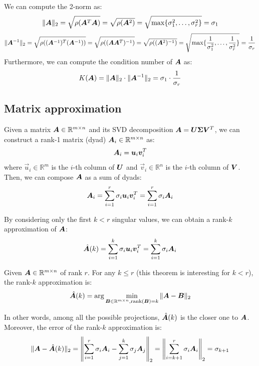 We can compute the 2-norm as:
\[ \Vert {\bm{A}} \Vert_2 = \sqrt{\rho({\bm{A}}^T{\bm{A}})} = \sqrt{\rho({\bm{A}}^2)} = \sqrt{\max\{\sigma_1^2, \dots, \sigma_r^2\}} = \sigma_1 \]
\[ 
    \Vert {\bm{A}}^{-1} \Vert_2 = \sqrt{\rho(({\bm{A}}^{-1})^T({\bm{A}}^{-1}))} = 
    \sqrt{\rho(({\bm{A}}{\bm{A}}^T)^{-1})} = \sqrt{\rho(({\bm{A}}^2)^{-1})} = \sqrt{\max\{\frac{1}{\sigma_1^2}, \dots, \frac{1}{\sigma_r^2}\}} = \frac{1}{\sigma_r}
\]
Furthermore, we can compute the condition number of ${\bm{A}}$ as:
\[ K({\bm{A}}) = \Vert {\bm{A}} \Vert_2 \cdot \Vert {\bm{A}}^{-1} \Vert_2 = \sigma_1 \cdot \frac{1}{\sigma_r} \]



\subsection{Matrix approximation}
Given a matrix ${\bm{A}} \in \mathbb{R}^{m \times n}$ and its SVD decomposition ${\bm{A}} = {\bm{U}}{\bm{\Sigma}}{\bm{V}}^T$,
we can construct a rank-1 matrix (dyad) ${\bm{A}}_i \in \mathbb{R}^{m \times n}$ as: 
\[ {\bm{A}}_i = {\bm{u}}_i {\bm{v}}_i^T \]
where $\vec{u}_i \in \mathbb{R}^m$ is the $i$-th column of ${\bm{U}}$ and
$\vec{v}_i \in \mathbb{R}^n$ is the $i$-th column of ${\bm{V}}$.
Then, we can compose ${\bm{A}}$ as a sum of dyads:
\[ {\bm{A}}_i = \sum_{i=1}^{r} \sigma_i {\bm{u}}_i {\bm{v}}_i^T = \sum_{i=1}^{r} \sigma_i {\bm{A}}_i \]

By considering only the first $k < r$ singular values, we can obtain a rank-$k$ approximation of ${\bm{A}}$:
\[ \hat{{\bm{A}}}(k) = \sum_{i=1}^{k} \sigma_i {\bm{u}}_i {\bm{v}}_i^T = \sum_{i=1}^{k} \sigma_i {\bm{A}}_i \]

\begin{theorem}
    Given ${\bm{A}} \in \mathbb{R}^{m \times n}$ of rank $r$.
    For any $k \leq r$ (this theorem is interesting for $k < r$), the rank-$k$ approximation is:
    \[ 
        \hat{{\bm{A}}}(k) = \arg \min_{{\bm{B}} \in \mathbb{R}^{m \times n}, \text{rank}({\bm{B}}) = k} \Vert {\bm{A}} - {\bm{B}} \Vert_2 
    \]
\end{theorem}
In other words, among all the possible projections, $\hat{{\bm{A}}}(k)$ is the closer one to ${\bm{A}}$.
Moreover, the error of the rank-$k$ approximation is:
\[
    \Vert {\bm{A}} - \hat{{\bm{A}}}(k) \Vert_2 = 
        \left\Vert \sum_{i=1}^{r} \sigma_i {\bm{A}}_i - \sum_{j=1}^{k} \sigma_j {\bm{A}}_j \right\Vert_2 =
        \left\Vert \sum_{i=k+1}^{r} \sigma_i {\bm{A}}_i \right\Vert_2 = 
        \sigma_{k+1}
\]

